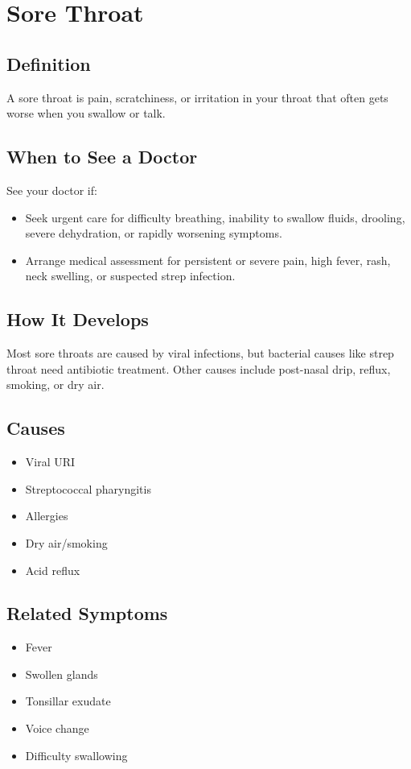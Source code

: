 \chapter{Sore Throat}

\section*{Definition}
A sore throat is pain, scratchiness, or irritation in your throat that often gets worse when you swallow or talk.

\section*{When to See a Doctor}
See your doctor if:
\begin{itemize}
  \item Seek urgent care for difficulty breathing, inability to swallow fluids, drooling, severe dehydration, or rapidly worsening symptoms.
  \item Arrange medical assessment for persistent or severe pain, high fever, rash, neck swelling, or suspected strep infection.
\end{itemize}

\section*{How It Develops}
Most sore throats are caused by viral infections, but bacterial causes like strep throat need antibiotic treatment. Other causes include post-nasal drip, reflux, smoking, or dry air.

\section*{Causes}
\begin{itemize}
  \item Viral URI
  \item Streptococcal pharyngitis
  \item Allergies
  \item Dry air/smoking
  \item Acid reflux
\end{itemize}

\section*{Related Symptoms}
\begin{itemize}
  \item Fever
  \item Swollen glands
  \item Tonsillar exudate
  \item Voice change
  \item Difficulty swallowing
\end{itemize}

